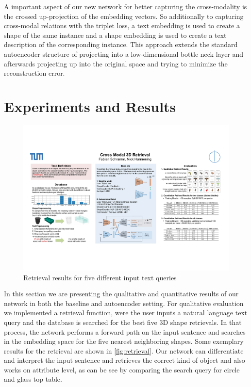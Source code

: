 \documentclass[10pt,twocolumn,letterpaper]{article}
\begin{document}
A important aspect of our new network for better capturing the cross-modality is the crossed up-projection of the embedding vectors. So additionally to capturing cross-modal relations with the triplet loss, a text embedding is used to create a shape of the same instance and a shape embedding is used to create a text description of the corresponding instance. This approach extends the standard autoencoder structure of projecting into a low-dimensional bottle neck layer and afterwards projecting up into the original space and trying to minimize the reconstruction error.

\section{Experiments and Results}
\begin{figure}[t]%
	\centering
	\includegraphics[width=1\linewidth]{fig5.pdf}
	\caption[]{Retrieval results for five different input text queries}
	\label{fig:retrieval}
\end{figure}

In this section we are presenting the qualitative and quantitative results of our network in both the baseline and autoencoder setting. For qualitative evaluation we implemented a retrieval function, were the user inputs a natural language text query and the database is searched for the best five 3D shape retrievals. In that process, the network performs a forward path on the input sentence and searches in the embedding space for the five nearest neighboring shapes. Some exemplary results for the retrieval are shown in \autoref{fig:retrieval}. Our network can differentiate and interpret the input sentence and retrieves the correct kind of object and also works on attribute level, as can be see by comparing the search query for circle and glass top table.
\end{document}
